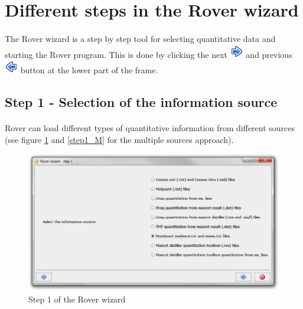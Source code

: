 \documentclass[11pt,a4paper,oneside,notitlepage]{book}
\begin{document}
\section{Different steps in the Rover wizard}

\paragraph{}The Rover wizard is a step by step tool for selecting quantitative data and starting the Rover program. This is done by clicking the next \includegraphics[scale=0.6, H]{forward.png} and previous \includegraphics[scale=0.6, H]{back.png} button at the lower part of the frame.

\subsection{Step 1 - Selection of the information source}

\paragraph{}Rover can load different types of quantitative information from different sources (see figure \ref{step1} and \ref{step1_M} for the multiple sources approach). 

\begin{figure}[H]
\begin{center}
\includegraphics[scale=0.4]{Rover_wizard_-_step_1_S.png}
\caption{Step 1 of the Rover wizard}
\label{step1}
\end{center}
\end{figure}
\end{document}
